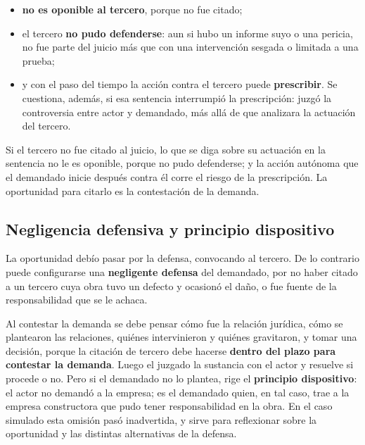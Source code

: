 \documentclass[12pt,oneside]{book}
\begin{document}
\begin{itemize}
    \item \textbf{no es oponible al tercero}, porque no fue citado;
    \item el tercero \textbf{no pudo defenderse}: aun si hubo un informe suyo o una pericia, no fue parte del juicio m\'as que con una intervenci\'on sesgada o limitada a una prueba;
    \item y con el paso del tiempo la acci\'on contra el tercero puede \textbf{prescribir}. Se cuestiona, adem\'as, si esa sentencia interrumpi\'o la prescripci\'on: juzg\'o la controversia entre actor y demandado, m\'as all\'a de que analizara la actuaci\'on del tercero.
\end{itemize}

\begin{important}
Si el tercero no fue citado al juicio, lo que se diga sobre su actuaci\'on en la sentencia no le es oponible, porque no pudo defenderse; y la acci\'on aut\'onoma que el demandado inicie despu\'es contra \'el corre el riesgo de la prescripci\'on. La oportunidad para citarlo es la contestaci\'on de la demanda.
\end{important}

\subsection{Negligencia defensiva y principio dispositivo}

La oportunidad deb\'io pasar por la defensa, convocando al tercero. De lo contrario puede configurarse una \textbf{negligente defensa} del demandado, por no haber citado a un tercero cuya obra tuvo un defecto y ocasion\'o el da\~no, o fue fuente de la responsabilidad que se le achaca.

Al contestar la demanda se debe pensar c\'omo fue la relaci\'on jur\'idica, c\'omo se plantearon las relaciones, qui\'enes intervinieron y qui\'enes gravitaron, y tomar una decisi\'on, porque la citaci\'on de tercero debe hacerse \textbf{dentro del plazo para contestar la demanda}. Luego el juzgado la sustancia con el actor y resuelve si procede o no. Pero si el demandado no lo plantea, rige el \textbf{principio dispositivo}: el actor no demand\'o a la empresa; es el demandado quien, en tal caso, trae a la empresa constructora que pudo tener responsabilidad en la obra. En el caso simulado esta omisi\'on pas\'o inadvertida, y sirve para reflexionar sobre la oportunidad y las distintas alternativas de la defensa.
\end{document}
